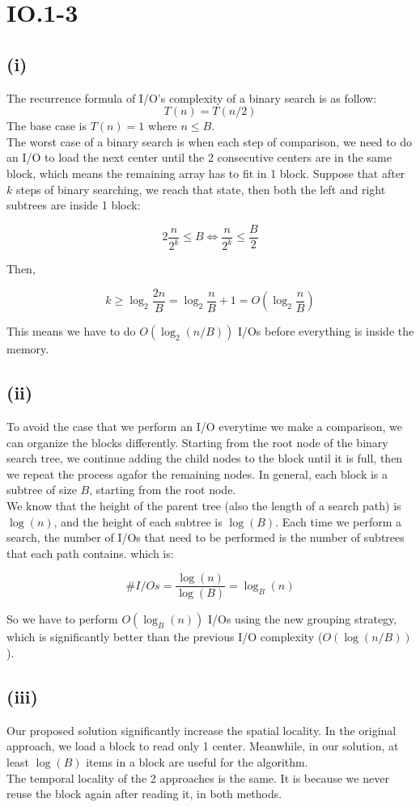\section*{IO.1-3}
\subsection*{(i)}

The recurrence formula of I/O's complexity of a binary search is as follow:
$$T(n) = T(n/2)$$
The base case is $T(n) = 1$ where $n \leq B$. \\

The worst case of a binary search is when each step of comparison, we need to do an I/O to load the next center until the 2 consecutive centers are in the same block, which means the remaining array has to fit in 1 block. Suppose that after $k$ steps of binary searching, we reach that state, then both the left and right subtrees are inside 1 block:

$$2 \frac{n}{2^k} \leq B \iff \frac{n}{2^k} \leq \frac{B}{2}$$

Then,

$$k \geq \log_2 \frac{2n}{B} = \log_2 \frac{n}{B} + 1 = O(\log_2 \frac{n}{B}) $$

This means we have to do $O(\log_2(n / B))$ I/Os before everything is inside the memory.

\subsection*{(ii)}
To avoid the case that we perform an I/O everytime we make a comparison, we can organize the blocks differently. Starting from the root node of the binary search tree, we continue adding the child nodes to the block until it is full, then we repeat the process agafor the remaining nodes. In general, each block is a subtree of size $B$, starting from the root node.\\

We know that the height of the parent tree (also the length of a search path) is $\log(n)$, and the height of each subtree is $\log(B)$. Each time we perform a search, the number of I/Os that need to be performed is the number of subtrees that each path contains. which is:

$$\#I/Os = \frac{\log(n)}{\log(B)} = \log_B (n)$$

So we have to perform $O(\log_B (n))$ I/Os using the new grouping strategy, which is significantly better than the previous I/O complexity ($O(\log(n/B))$).

\subsection*{(iii)}
Our proposed solution significantly increase the spatial locality. In the original approach, we load a block to read only 1 center. Meanwhile, in our solution, at least $\log(B)$ items in a block are useful for the algorithm.\\

The temporal locality of the 2 approaches is the same. It is because we never reuse the block again after reading it, in both methods.
